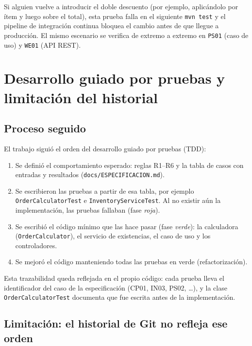 \documentclass[11pt,a4paper]{article}
\begin{document}
Si alguien vuelve a introducir el doble descuento (por ejemplo, aplicándolo por ítem y luego sobre el
total), esta prueba falla en el siguiente \texttt{mvn test} y el pipeline de integración continua
bloquea el cambio antes de que llegue a producción. El mismo escenario se verifica de extremo a
extremo en \texttt{PS01} (caso de uso) y \texttt{WE01} (API REST).

\section{Desarrollo guiado por pruebas y limitación del historial}
\label{sec:tdd}

\subsection{Proceso seguido}

El trabajo siguió el orden del desarrollo guiado por pruebas (TDD):

\begin{enumerate}[noitemsep]
  \item Se definió el comportamiento esperado: reglas R1--R6 y la tabla de casos con entradas y
        resultados (\texttt{docs/ESPECIFICACION.md}).
  \item Se escribieron las pruebas a partir de esa tabla, por ejemplo
        \texttt{OrderCalculatorTest} e \texttt{InventoryServiceTest}. Al no existir aún la implementación, las pruebas
        fallaban (fase \emph{roja}).
  \item Se escribió el código mínimo que las hace pasar (fase \emph{verde}): la calculadora
        (\texttt{OrderCalculator}), el servicio de existencias, el caso de uso y los controladores.
  \item Se mejoró el código manteniendo todas las pruebas en verde (refactorización).
\end{enumerate}

Esta trazabilidad queda reflejada en el propio código: cada prueba lleva el identificador del caso de
la especificación (CP01, IN03, PS02, \ldots), y la clase \texttt{OrderCalculatorTest} documenta que fue
escrita antes de la implementación.

\subsection{Limitación: el historial de Git no refleja ese orden}
\end{document}
